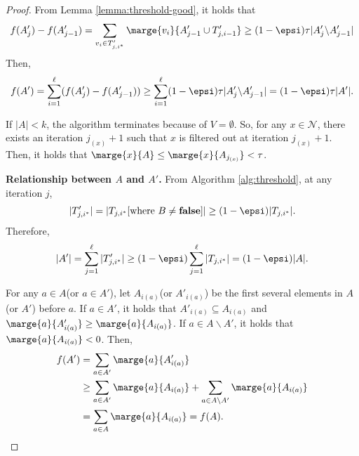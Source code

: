 \begin{proof}
From Lemma \ref{lemma:threshold-good}, it holds that 
$$f(A'_j)-f(A'_{j-1}) = \sum_{v_i \in T'_{j,i^*}} \marge{v_i}{A'_{j-1} \cup T'_{j,i-1}}
\ge (1-\epsi)\tau |A'_j\backslash A'_{j-1}|$$
Then,
$$f(A') = \sum_{i=1}^\ell (f(A'_j)-f(A'_{j-1})) 
\ge \sum_{i=1}^\ell (1-\epsi)\tau |A'_j\backslash A'_{j-1}|=(1-\epsi)\tau|A'|.$$

If $|A| < k$, the algorithm terminates because of $V=\emptyset$.
So, for any $x \in \mathcal{N}$,
there exists an iteration $j_{(x)}+1$ such that
$x$ is filtered out at iteration $j_{(x)}+1$.
Then, it holds that $\marge{x}{A} \le \marge{x}{A_{j_{(x)}}}<\tau$.

\textbf{Relationship between $A$ and $A'$.}
From Algorithm \ref{alg:threshold}, at any iteration $j$,
$$|T'_{j,i^*}|=|T_{j,i^*}[\text{where } B \not = \textbf{false}]|\ge (1-\epsi)|T_{j,i^*}|.$$
Therefore, 
$$|A'|=\sum_{j=1}^\ell |T'_{j,i^*}|\ge 
(1-\epsi)\sum_{j=1}^\ell |T_{j,i^*}| = (1-\epsi)|A|.$$

For any $a\in A$(or $a \in A'$), let $A_{i(a)}$(or $A'_{i(a)}$) be the first several elements in $A$(or $A'$) before $a$.
If $a \in A'$, it holds that $A'_{i(a)} \subseteq A_{i(a)}$ and $\marge{a}{A'_{i(a)}} \ge \marge{a}{A_{i(a)}}$.
If $a \in A\backslash A'$, it holds that $\marge{a}{A_{i(a)}} < 0$.
Then,
\begin{align*}
    f(A') &= \sum_{a\in A'} \marge{a}{A'_{i(a)}} \\
    &\ge \sum_{a\in A'} \marge{a}{A_{i(a)}} + \sum_{a\in A\backslash A'} \marge{a}{A_{i(a)}}\\  
    &= \sum_{a\in A} \marge{a}{A_{i(a)}}=f(A).
\end{align*}
\end{proof}

